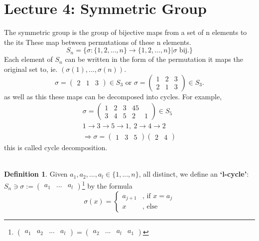 \documentclass{article}
\theoremstyle{definition}
\newtheorem{definition}{Definition}[section]
\theoremstyle{remark}
\begin{document}
\section{Lecture 4: Symmetric Group}
The symmetric group is the group of bijective maps from a set of n elements to the its These map between permutations of these n elements.
\begin{equation}
\label{eq: SymmetricGroup}
S_n=\lbrace \sigma:\lbrace 1,2,...,n\rbrace\rightarrow\lbrace1,2,...,n\rbrace|\sigma \text{ bij}.\rbrace
\end{equation}
Each element of $S_n$ can be written in the form of the permutation it maps the original set to, ie. $\left(\sigma(1),...,\sigma(n)\right)$. \\
\begin{equation}
\sigma = \begin{pmatrix}
2&1&3
\end{pmatrix} \in S_3
\text{ or } \sigma =\begin{pmatrix}
1&2&3\\ 2&1&3
\end{pmatrix}\in S_3.
\end{equation}
as well as this these maps can be decomposed into cycles. For example,
\begin{align*}
\sigma=\begin{pmatrix}
1&2&3&45\\ 3&4&5&2&1
\end{pmatrix}\in S_5\\
1\rightarrow 3 \rightarrow 5 \rightarrow 1,~2\rightarrow 4 \rightarrow 2\\
\Rightarrow \sigma = \begin{pmatrix}
1&3&5
\end{pmatrix}\begin{pmatrix}
2&4
\end{pmatrix}
\end{align*}
this is called cycle decomposition.\\
\vspace{2mm}~\\
\begin{definition}
Given $a_1,a_2,...,a_l\in \lbrace 1,...,n\rbrace$, all distinct, we define an \textbf{`l-cycle'}: $S_n\ni\sigma:=\begin{pmatrix}
a_1&...&a_l
\end{pmatrix}$\footnote{$\begin{pmatrix}
a_1&a_2&...&a_l
\end{pmatrix}=\begin{pmatrix}
a_2&...&a_l&a_1
\end{pmatrix}$}
 by the formula 
 \begin{equation}
 \sigma(x)=
	 \begin{cases}
 			a_{j+1} &\text{, if }x=a_j \\
 			x &\text{, else}
	 \end{cases}
 \end{equation}
\end{definition}
\end{document}
